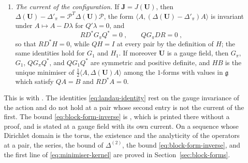 \documentclass[11pt]{preprint}
\makeatletter
\DeclarePairedDelimiter{\norm}{\lVert}{\rVert}
\newcommand*{\bigcdot}{}%
\DeclareRobustCommand*{\bigcdot}{%
	\mathbin{\mathpalette\bigcdot@{}}%
}
\newcommand*{\bigcdot@scalefactor}{.7}
\newcommand*{\bigcdot@widthfactor}{1.15}
\newcommand*{\bigcdot@}[2]{%
	\sbox0{$#1\vcenter{}$}%
	\sbox2{$#1\cdot\m@th$}%
	\hbox to \bigcdot@widthfactor\wd2{%
		\hss
		\raise\ht0\hbox{%
			\scalebox{\bigcdot@scalefactor}{%
				\lower\ht0\hbox{$#1\bullet\m@th$}%
			}%
		}%
		\hss
	}%
}
\numberwithin{equation}{section}
\makeatother
\begin{document}
\begin{theorem}
\begin{enumerate}[label=(\roman*)]
and the same holds with $G_1$. For $x \in \Delta(y)$, $y \in \Gamma_j$, a bond $c'$ of $\Gamma_{j'}$, a real function $\zeta$ supported in $\tilde\Delta(y)$, and $0 \leqslant \beta \leqslant \beta_0 < 1$, the kernels of $H$ and of $H_1$ satisfy
\begin{equation}\label{eq:minimiser-kernel}
\begin{aligned}
    \norm{H(x, c')} + a_j\norm{\nabla H(x, c')} &\leqslant B_1a_{j'}^{-4}e^{-\frac{1}{2}\delta_1d(y, c'_-)}\;,\\
    \norm{\zeta\nabla H(\bigcdot, c')}_\beta &\leqslant B_1(\beta_0)a_j^{-1-\beta}\bigl(\norm\zeta_\beta^{(j)} + \norm\zeta_\infty\bigr)a_{j'}^{-4}e^{-\frac{1}{2}\delta_1d(y, c'_-)}\;.
\end{aligned}
\end{equation}
\item \emph{The current of the configuration.} If $\mathbf J = J(\mathbf U)$, then $\Delta(\mathbf U) - \Delta'_\pi = \mathcal P^T\Delta(\mathbf U)\mathcal P$, the form $\langle A, (\Delta(\mathbf U) - \Delta'_\pi)A\rangle$ is invariant under $A \mapsto A - D\lambda$ for $Q'\lambda = 0$, and
\begin{equation}\label{eq:landau-identity}
    RD^*G_\pi Q^* = 0\;,
    \qquad
    QG_\pi DR = 0\;,
\end{equation}
so that $RD^*H = 0$, while $QH = I$ at every pair by the definition of $H$; the same identities hold for $G_1$ and $H_1$. If moreover $\mathbf U$ is a gauge field, then $G_\pi$, $G_1$, $QG_\pi Q^*$, and $QG_1Q^*$ are symmetric and positive definite, and $HB$ is the unique minimiser of $\frac{1}{2}\langle A, \Delta(\mathbf U)A\rangle$ among the $1$-forms with values in $\mathfrak g$ which satisfy $QA = B$ and $RD^*A = 0$.
\end{enumerate}
\end{theorem}

This is \cite[Theorem~3.12]{BalabanPBG} with \cite[(3.124), (3.126), (3.130)--(3.138)]{BalabanPBG}. The identities \eqref{eq:landau-identity} rest on the gauge invariance of the action and do not hold at a pair whose second entry is not the current of the first. The bound \eqref{eq:block-form-inverse} is \cite[(3.132)]{BalabanPBG}, which is printed there without a proof, and \cite[Theorem~3.12]{BalabanPBG} is stated at a gauge field with its own current. On a sequence whose Dirichlet domain is the torus, the existence and the analyticity of the operators at a pair, the series, the bound of $\Delta^{(2)}$, the bound \eqref{eq:block-form-inverse}, and the first line of \eqref{eq:minimiser-kernel} are proved in Section~\ref{sec:block-forms}.
\end{document}
